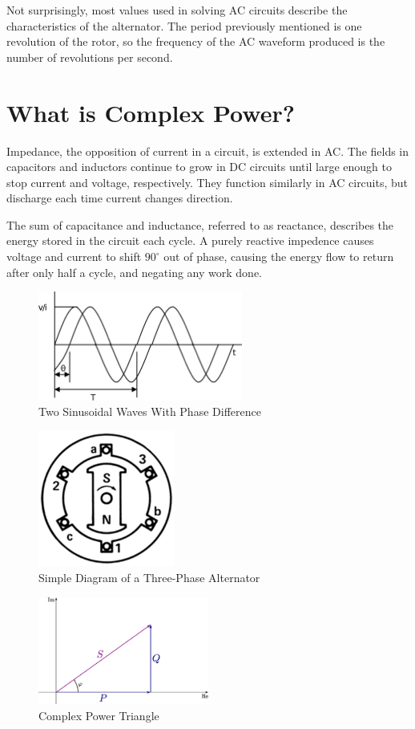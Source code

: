 \documentclass[12pt]{article}
\begin{document}
  Not surprisingly, most values used in solving \ac{AC} circuits describe the
  characteristics of the alternator.  The period previously mentioned is one
  revolution of the rotor, so the frequency of the \ac{AC} waveform produced is
  the number of revolutions per second.

  \section*{What is Complex Power?}
  Impedance, the opposition of current in a circuit, is extended in \ac{AC}.
  The fields in capacitors and inductors continue to grow in \ac{DC} circuits
  until large enough to stop current and voltage, respectively.  They function
  similarly in \ac{AC} circuits, but discharge each time current changes
  direction.

  The sum of capacitance and inductance, referred to as reactance, describes
  the energy stored in the circuit each cycle.  A purely reactive impedence
  causes voltage and current to shift $90^\circ$ out of phase, causing the
  energy flow to return after only half a cycle, and negating any work done.

  \begin{figure}[p]
    \centering
    \includegraphics[width=0.6\textwidth]{img/acwave}
    \caption{Two Sinusoidal Waves With Phase Difference}
    \label{acwave}
  \end{figure}

  \begin{figure}[p]
    \centering
    \includegraphics[width=0.4\textwidth]{img/threephasemotor}
    \caption{Simple Diagram of a Three-Phase Alternator}
    \label{alternator}
  \end{figure}

  \begin{figure}[p]
    \centering
    \includegraphics[width=0.5\textwidth]{img/complexpwr}
    \caption{Complex Power Triangle}
    \label{complexpwr}
  \end{figure}
\end{document}
